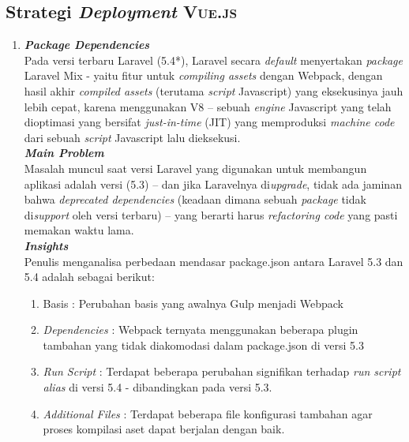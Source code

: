 \subsection{Strategi \textit{Deployment} \textsc{Vue.js}}
	
\begin{enumerate}
\item \textbf{\textit{Package Dependencies}} \\
	Pada versi terbaru Laravel (5.4*), Laravel secara \textit{default} menyertakan \textit{package} Laravel Mix - yaitu fitur untuk \textit{compiling assets} dengan Webpack, dengan hasil akhir \textit{compiled assets} (terutama \textit{script} Javascript) yang eksekusinya jauh lebih cepat, karena menggunakan V8 -- sebuah \textit{engine} Javascript yang telah dioptimasi yang bersifat \textit{just-in-time} (JIT) yang memproduksi \textit{machine code} dari sebuah \textit{script} Javascript lalu dieksekusi.\\
  
  \textbf{\textit{Main Problem}} \\
  Masalah muncul saat versi Laravel yang digunakan untuk membangun aplikasi adalah versi (5.3) -- dan jika Laravelnya di\textit{upgrade}, tidak ada jaminan bahwa \textit{deprecated dependencies} (keadaan dimana sebuah \textit{package} tidak di\textit{support} oleh versi terbaru) -- yang berarti harus \textit{refactoring code} yang pasti memakan waktu lama.\\			  

	\textbf{\textit{Insights}} \\
	Penulis menganalisa perbedaan mendasar package.json antara Laravel 5.3 dan 5.4 adalah sebagai berikut:
	\begin{enumerate}[label={\alph*}.]
  	  	\item Basis : Perubahan basis yang awalnya Gulp menjadi Webpack
  	  	\item \textit{Dependencies} : Webpack ternyata menggunakan beberapa plugin tambahan yang tidak diakomodasi dalam package.json di versi 5.3
  	  	\item \textit{Run Script} : Terdapat beberapa perubahan signifikan terhadap \textit{run script alias} di versi 5.4 - dibandingkan pada versi 5.3.
  	  	\item \textit{Additional Files} : Terdapat beberapa file konfigurasi tambahan agar proses kompilasi aset dapat berjalan dengan baik.
	\end{enumerate}
	\ \\
  

\end{enumerate}
